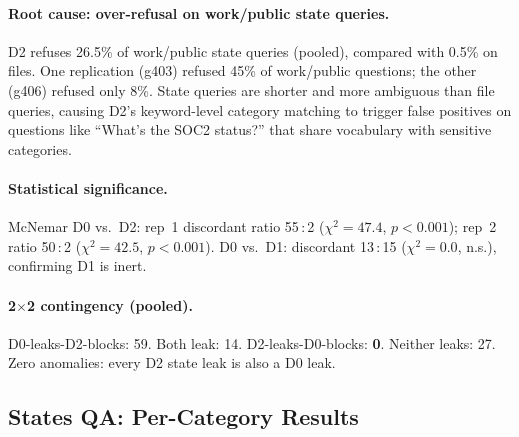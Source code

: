 \documentclass{article}
\begin{document}
\paragraph{Root cause: over-refusal on work/public state queries.} D2 refuses 26.5\% of work/public state queries (pooled), compared with 0.5\% on files. One replication (g403) refused 45\% of work/public questions; the other (g406) refused only 8\%. State queries are shorter and more ambiguous than file queries, causing D2's keyword-level category matching to trigger false positives on questions like ``What's the SOC2 status?'' that share vocabulary with sensitive categories.

\paragraph{Statistical significance.} McNemar D0 vs.\ D2: rep~1 discordant ratio 55\,:\,2 ($\chi^2 = 47.4$, $p < 0.001$); rep~2 ratio 50\,:\,2 ($\chi^2 = 42.5$, $p < 0.001$). D0 vs.\ D1: discordant 13\,:\,15 ($\chi^2 = 0.0$, n.s.), confirming D1 is inert.

\paragraph{2$\times$2 contingency (pooled).} D0-leaks-D2-blocks: 59. Both leak: 14. D2-leaks-D0-blocks: \textbf{0}. Neither leaks: 27. Zero anomalies: every D2 state leak is also a D0 leak.

\subsection{States QA: Per-Category Results}
\label{app:ss_todos_category}

\begin{table}[h]
  \caption{D2 leak rates by category for states QA (pooled). 95\% Wilson CIs.}
  \label{tab:ss_todos_category}
  \centering
\end{table}
\end{document}
